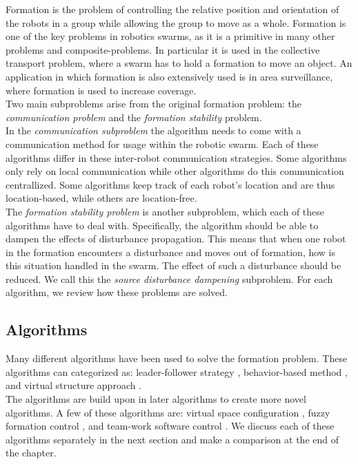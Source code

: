 
Formation is the problem of controlling the relative position and orientation of the robots in a group while allowing the group to move as a whole. \cite{consolini2008leader}
Formation is one of the key problems in robotics swarms, as it is a primitive in many other problems and composite-problems.
In particular it is used in the collective transport problem, where a swarm has to hold a formation to move an object. 
An application in which formation is also extensively used is in area surveillance, where formation is used to increase coverage. \cite{burkle2011towards}\\

Two main subproblems arise from the original formation problem: the \emph{communication problem} and the \emph{formation stability} problem.\\
In the \emph{communication subproblem} the algorithm needs to come with a communication method for usage within the robotic swarm. 
Each of these algorithms differ in these inter-robot communication strategies. 
Some algorithms only rely on local communication while other algorithms do this communication centrallized.
Some algorithms keep track of each robot's location and are thus location-based, while others are location-free. \\

The \emph{formation stability problem} is another subproblem, which each of these algorithms have to deal with.
Specifically, the algorithm should be able to dampen the effects of disturbance propagation. 
This means that when one robot in the formation encounters a disturbance and moves out of formation, how is this situation handled in the swarm. 
The effect of such a disturbance should be reduced.
We call this the \emph{source disturbance dampening} subproblem. 
For each algorithm, we review how these problems are solved.

\subsection{Algorithms}
Many different algorithms have been used to solve the formation problem. \cite{chen2005formation,consolini2008leader}
These algorithms can categorized as: leader-follower strategy \cite{consolini2008leader,das2002vision}, 
behavior-based method \cite{balch1998behavior,lawton2003decentralized}, 
and virtual structure approach \cite{ren2004decentralized,do2007nonlinear}. \\
The algorithms are build upon in later algorithms to create more novel algorithms. A few of these algorithms are: 
virtual space configuration \cite{wee2013formation}, 
fuzzy formation control \cite{ranjbar2012novel},
and team-work software control \cite{kaminka2013use}. We discuss each of these algorithms separately in the next section and make a comparison at the end of the chapter.

